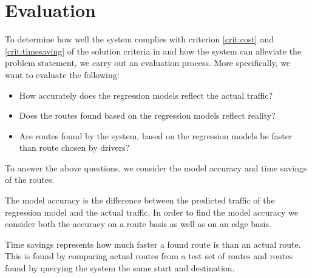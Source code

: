 \section{Evaluation}
To determine how well the system complies with criterion \ref{crit:cost} and \ref{crit:timesaving} of the solution criteria in  and how the system can alleviate the problem statement, we carry out an evaluation process. More specifically, we want to evaluate the following:
\begin{itemize}
\item How accurately does the regression models reflect the actual traffic?
\item Does the routes found based on the regression models reflect reality?
\item Are routes found by the system, based on the regression models be faster than route chosen by drivers?
\end{itemize}
To answer the above questions, we consider the model accuracy and time savings of the routes. 

The model accuracy is the difference between the predicted traffic of the regression model and the actual traffic. In order to find the model accuracy we consider both the accuracy on a route basis as well as on an edge basis.

Time savings represents how much faster a found route is than an actual route. This is found by comparing actual routes from a test set of routes and routes found by querying the system the same start and destination.

